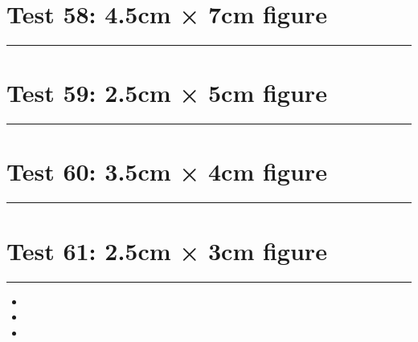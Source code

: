 \documentclass[a4paper,11pt]{article}
\begin{document}
\section*{Test 58: 4.5cm × 7cm figure}
\begin{swarmwrap}%
  \begin{minipage}[t]{4cm}
    \centering
    \rule{\linewidth}{7cm}
  \end{minipage}%
\end{swarmwrap}%
\swarmwrapnext
\lipsum[65]
\lipsum[66]
\lipsum[67]
\section*{Test 59: 2.5cm × 5cm figure}
\begin{swarmwrap}%
  \begin{minipage}[t]{2cm}
    \centering
    \rule{\linewidth}{5cm}
  \end{minipage}%
\end{swarmwrap}%
\swarmwrapnext
\lipsum[37]
\lipsum[38]
\lipsum[39]
\lipsum[40]
\lipsum[41]
\lipsum[42]
\section*{Test 60: 3.5cm × 4cm figure}
\begin{swarmwrap}%
  \begin{minipage}[t]{3cm}
    \centering
    \rule{\linewidth}{4cm}
  \end{minipage}%
\end{swarmwrap}%
\swarmwrapnext
\lipsum[120]
\lipsum[121]
\lipsum[122]
\lipsum[123]
\lipsum[124]
\section*{Test 61: 2.5cm × 3cm figure}
\begin{swarmwrap}%
  \begin{minipage}[t]{2cm}
    \centering
    \rule{\linewidth}{3cm}
  \end{minipage}%
\end{swarmwrap}
\begin{itemize}
  \item \swarmwrapnext\lipsum[141][1-4]
  \item \lipsum[143][1-3]
  \item \lipsum[144][1-3]
\end{itemize}
\end{document}
